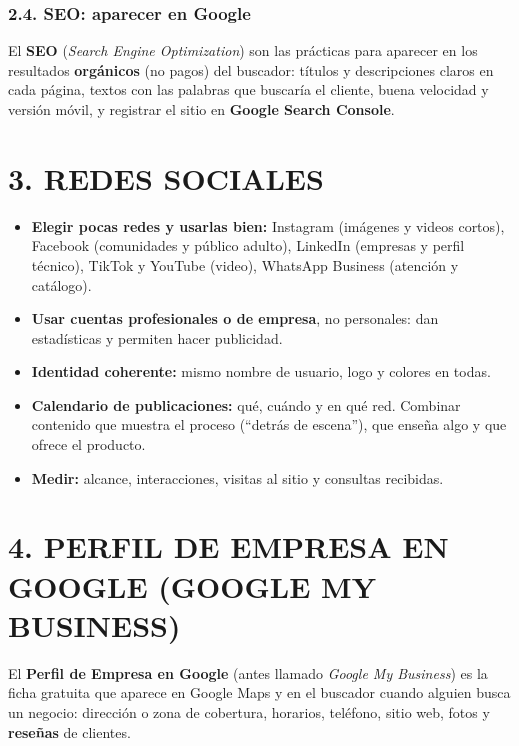 \subsubsection*{2.4. SEO: aparecer en Google}
El \textbf{SEO} (\textit{Search Engine Optimization}) son las prácticas para aparecer en los
resultados \textbf{orgánicos} (no pagos) del buscador: títulos y descripciones claros en cada
página, textos con las palabras que buscaría el cliente, buena velocidad y versión móvil, y
registrar el sitio en \textbf{Google Search Console}.

\section*{3. REDES SOCIALES}

\begin{itemize}
  \item \textbf{Elegir pocas redes y usarlas bien:} Instagram (imágenes y videos cortos),
        Facebook (comunidades y público adulto), LinkedIn (empresas y perfil técnico),
        TikTok y YouTube (video), WhatsApp Business (atención y catálogo).
  \item \textbf{Usar cuentas profesionales o de empresa}, no personales: dan estadísticas y
        permiten hacer publicidad.
  \item \textbf{Identidad coherente:} mismo nombre de usuario, logo y colores en todas.
  \item \textbf{Calendario de publicaciones:} qué, cuándo y en qué red. Combinar contenido que
        muestra el proceso (``detrás de escena''), que enseña algo y que ofrece el producto.
  \item \textbf{Medir:} alcance, interacciones, visitas al sitio y consultas recibidas.
\end{itemize}

\section*{4. PERFIL DE EMPRESA EN GOOGLE (GOOGLE MY BUSINESS)}

El \textbf{Perfil de Empresa en Google} (antes llamado \textit{Google My Business}) es la ficha
gratuita que aparece en Google Maps y en el buscador cuando alguien busca un negocio: dirección
o zona de cobertura, horarios, teléfono, sitio web, fotos y \textbf{reseñas} de clientes.

